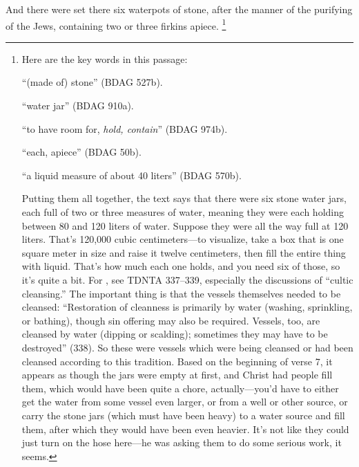 			And there were set there six waterpots of stone, after the manner of the purifying of the Jews, containing two or three firkins apiece.%
				\footnote{%
					Here are the key words in this passage:
						\begin{compactdesc}
							\item[\gr{λίθιναι}] ``(made of) stone'' (BDAG 527b).
							\item[\gr{ὑδρίαι}] ``water jar'' (BDAG 910a).
							\item[\gr{χωροῦσαι}] ``to have room for, \textit{hold, contain}'' (BDAG 974b).
							\item[\gr{ἀνὰ}] ``each, apiece'' (BDAG 50b).
							\item[\gr{μετρητὰς}] ``a liquid measure of about 40 liters'' (BDAG 570b).
						\end{compactdesc}
					Putting them all together, the text says that there were six stone water jars, each full of two or three measures of water, meaning they were each holding between 80 and 120 liters of water. Suppose they were all the way full at 120 liters. That's 120,000 cubic centimeters---to visualize, take a box that is one square meter in size and raise it twelve centimeters, then fill the entire thing with liquid. That's how much each one holds, and you need six of those, so it's quite a bit. For , see TDNTA 337--339, especially the discussions of ``cultic cleansing.'' The important thing is that the vessels themselves needed to be cleansed: ``Restoration of cleanness is primarily by water (washing, sprinkling, or bathing), though sin offering may also be required. Vessels, too, are cleansed by water (dipping or scalding); sometimes they may have to be destroyed'' (338). So these were vessels which were being cleansed or had been cleansed according to this tradition. Based on the beginning of verse 7, it appears as though the jars were empty at first, and Christ had people fill them, which would have been quite a chore, actually---you'd have to either get the water from some vessel even larger, or from a well or other source, or carry the stone jars (which must have been heavy) to a water source and fill them, after which they would have been even heavier. It's not like they could just turn on the hose here---he was asking them to do some serious work, it seems.
					}

